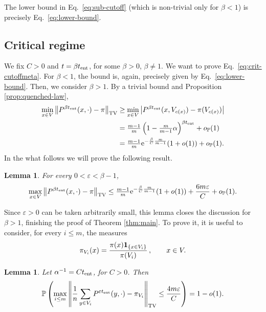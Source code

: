 \documentclass[11pt,oneside]{amsart}
\numberwithin{equation}{section}  %
\theoremstyle{plain}
\newtheorem{lemma}[theorem]{Lemma}
\newcommand{\eps}{\varepsilon}
\newcommand{\p}{\mathbb{P}}
\newcommand{\one}{\textup{\textbf{1}}}
\newcommand{\op}{o_{\p}}
\newcommand{\tv}[1]{\left\|#1\right\|_{\rm TV}}
\newcommand{\tent}{t_{\textup{ent}}}
\begin{document}
The lower bound in Eq.~\eqref{eq:sub-cutoff} (which is non-trivial only for $\beta<1$) is precisely Eq.~\eqref{eq:lower-bound}.
%	
    \subsection{Critical regime}
	We fix $C>0$ and $t=\beta\tent$, for some $\beta>0$, $\beta\neq1$. We want to prove Eq.~\eqref{eq:crit-cutoffmeta}. For $\beta<1$, the bound is, again, precisely given by Eq.~\eqref{eq:lower-bound}.
    Then, we consider $\beta>1$. By a trivial bound and Proposition \ref{prop:quenched-law},
	\begin{equation}
		\begin{split}
			\min_{x \in V}\tv { P^{\beta\tent}(x,\cdot)-\pi }
			 &\ge  \min_{x \in V}\left|P^{\beta\tent}(x,V_{c(x)})-\pi(V_{c(x)})\right|\\
			& =\tfrac{m-1}m \left(1-\tfrac{m}{m-1}\alpha\right)^{\beta \tent}+\op(1)\\
            &=\tfrac{m-1}{m}{\rm e}^{-\frac{\beta}{C}\frac{m}{m-1}}(1+o(1))+\op(1).
		\end{split}
	\end{equation}
	In the what follows we will prove the following result.
    \begin{lemma} \label{lemma:desired}
        For every $0<\eps<\beta-1$, 	
            \begin{equation} 
		              \max_{x \in V}\tv { P^{\beta\tent}(x,\cdot)-\pi } 
                      \le \tfrac{m-1}{m}{\rm e}^{-\frac{\beta}{C}\frac{m}{m-1}}(1+o(1))+   \frac{6m\eps}{C}+\op(1).
                \end{equation}
    \end{lemma}
    Since $\eps>0$ can be taken arbitrarily small, this lemma closes the discussion for $\beta>1$, finishing the proof of Theorem \ref{thm:main}.
	    To prove it, it is useful to consider, for every $i \le m$, the measures
$$\pi_{V_i}(x)=\frac{\pi(x)\one_{\{x\in V_i\}}}{\pi(V_i)}\,, \qquad x \in V.
$$
%
\begin{lemma} \label{lemma:distance-eps} 
	Let $\alpha^{-1}=C \tent $, for $C> 0 $. Then
	\begin{equation}
	\p\left(\max_{i \le m}\tv { \frac1n  \sum_{y \in V_i}P^{\eps \tent}(y,\cdot )-{\pi_{V_i}} }\le \frac{4m\eps }{C}\right)=1-o(1).
	\end{equation}
\end{lemma}
\end{document}

